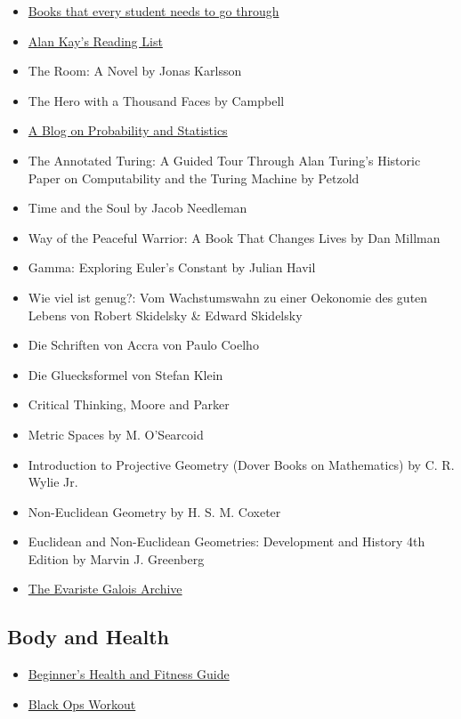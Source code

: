 \begin{itemize}
	\item \href{http://math.stackexchange.com/questions/94827/books-that-every-student-need\%20s-to-go-through}{Books that every student needs to go through}

	\item \href{http://www.squeakland.org/resources/books/readingList.jsp}{Alan Kay's Reading List}

	\item The Room: A Novel by Jonas Karlsson

	\item The Hero with a Thousand Faces by Campbell

	\item \href{https://probabilityandstats.wordpress.com/}{A Blog on
  Probability and Statistics}

	\item The Annotated Turing: A Guided Tour Through Alan Turing's Historic
  Paper on Computability and the Turing Machine by Petzold

	\item Time and the Soul by Jacob Needleman

	\item Way of the Peaceful Warrior: A Book That Changes Lives by Dan Millman

	\item Gamma: Exploring Euler's Constant by Julian Havil

	\item Wie viel ist genug?: Vom Wachstumswahn zu einer Oekonomie des guten
  Lebens von Robert Skidelsky \& Edward Skidelsky

	\item Die Schriften von Accra von Paulo Coelho

	\item Die Gluecksformel von Stefan Klein

	\item Critical Thinking, Moore and Parker

	\item Metric Spaces by M. O'Searcoid

	\item Introduction to Projective Geometry (Dover Books on Mathematics) by C. R. Wylie Jr.

	\item Non-Euclidean Geometry by H. S. M. Coxeter

	\item Euclidean and Non-Euclidean Geometries: Development and History 4th Edition by Marvin J. Greenberg

	\item  \href{http://www.galois-group.net/g/EN/theory.html}{The Evariste Galois Archive}
\end{itemize}

\subsection{Body and Health}

\begin{itemize}
  \item \href{http://liamrosen.com/fitness.html}{Beginner's Health and Fitness Guide}

  \item \href{http://darebee.com/workouts/black-ops-workout.html}{Black Ops Workout}

\end{itemize}
